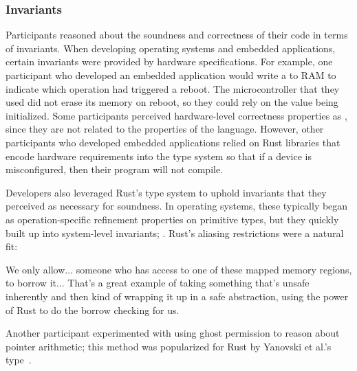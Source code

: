 \subsubsection{Invariants}
Participants reasoned about the soundness and correctness of their \unsafe code in terms of invariants.  When developing operating systems and embedded applications, certain invariants were provided by hardware specifications. For example, one participant who developed an embedded application would write a  to RAM to indicate which operation had triggered a reboot. The microcontroller that they used did not erase its memory on reboot, so they could rely on the value being initialized. Some participants perceived hardware-level correctness properties as , since they are not related to the properties of the language. However, other participants who developed embedded applications relied on Rust libraries that encode hardware requirements into the type system so that if a device is misconfigured, then their program will not compile.

Developers also leveraged Rust's type system to uphold invariants that they perceived as necessary for soundness. In operating systems, these typically began as operation-specific refinement properties on primitive types, but they quickly built up into system-level invariants; . Rust's aliasing restrictions were a natural fit:
\begin{pquote}{12}
We only allow... someone who has access to one of these mapped memory regions, to borrow it... That's a great example of taking something that's unsafe inherently and then kind of wrapping it up in a safe abstraction, using the power of Rust to do the borrow checking for us.
\end{pquote}
Another participant experimented with using ghost permission to reason about pointer arithmetic; this method was popularized for Rust by Yanovski et al.'s  type~\cite{ghostcell21}.

